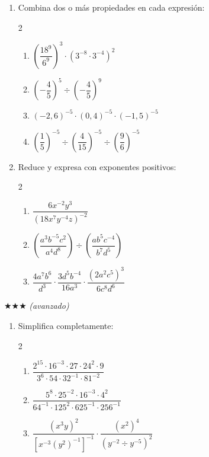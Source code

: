 \documentclass[11pt, letterpaper]{article}
\begin{document}
\begin{enumerate}[label=\textbf{\arabic*.}, leftmargin=*, resume]
  \item Combina dos o más propiedades en cada expresión:
  \begin{multicols}{2}
  \begin{enumerate}[label=\alph*)]
    \item $\left(\dfrac{18^9}{6^9}\right)^3\cdot(3^{-8}\cdot 3^{-4})^2$
    \item $\left(-\dfrac{4}{5}\right)^5 \div \left(-\dfrac{4}{5}\right)^9$
    \item $(-2{,}6)^{-5}\cdot(0{,}4)^{-5}\cdot(-1{,}5)^{-5}$
    \item $\left(\dfrac{1}{5}\right)^{-5} \div \left(\dfrac{4}{15}\right)^{-5} \div \left(\dfrac{9}{6}\right)^{-5}$
  \end{enumerate}
  \end{multicols}

  \item Reduce y expresa con exponentes positivos:
  \begin{multicols}{2}
  \begin{enumerate}[label=\alph*)]
    \item $\dfrac{6x^{-2}y^3}{(18x^7y^{-4}z)^{-2}}$
    \item $\left(\dfrac{a^3b^{-5}c^2}{a^4d^8}\right) \div \left(\dfrac{ab^5c^{-4}}{b^7d^5}\right)$
    \item $\dfrac{4a^7b^6}{d^3}\cdot\dfrac{3d^5b^{-4}}{16a^3}\cdot\dfrac{(2a^2c^5)^3}{6c^8d^6}$
  \end{enumerate}
  \end{multicols}
\end{enumerate}

$\bigstar\bigstar\bigstar$ \textit{(avanzado)}

\begin{enumerate}[label=\textbf{\arabic*.}, leftmargin=*, resume]
  \item Simplifica completamente:
  \begin{multicols}{2}
  \begin{enumerate}[label=\alph*)]
    \item $\dfrac{2^{15}\cdot 16^{-3}\cdot 27\cdot 24^2\cdot 9}{3^6\cdot 54\cdot 32^{-1}\cdot 81^{-2}}$
    \item $\dfrac{5^8\cdot 25^{-2}\cdot 16^{-3}\cdot 4^2}{64^{-1}\cdot 125^2\cdot 625^{-1}\cdot 256^{-1}}$
    \item $\dfrac{(x^3y)^2}{[x^{-3}(y^2)^{-1}]^{-1}}\cdot\dfrac{(x^2)^4}{(y^{-2} \div y^{-5})^2}$
  \end{enumerate}
  \end{multicols}
\end{enumerate}
\end{document}
